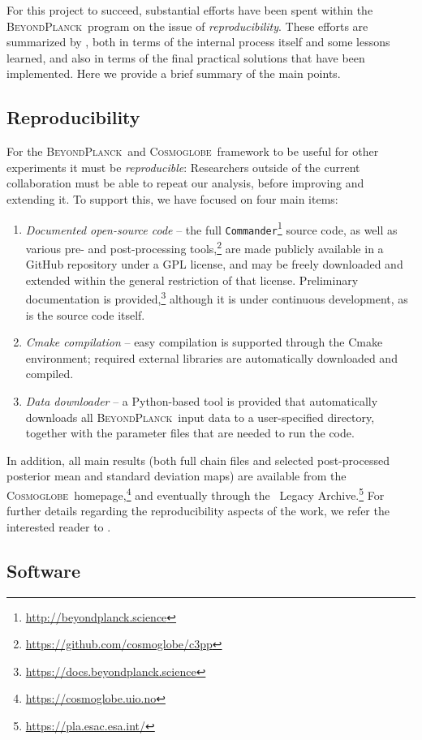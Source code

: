 \documentclass[onecolumn]{aa}
\def\commander{\texttt{Commander}}
\newcommand{\BP}{\textsc{BeyondPlanck}}
\newcommand{\cosmoglobe}{\textsc{Cosmoglobe}}
\begin{document}
For this project to succeed, substantial efforts have been spent
within the \BP\ program on the issue of \emph{reproducibility}. These
efforts are summarized by \citet{bp05}, both in terms of the internal
process itself and some lessons learned, and also in terms of the
final practical solutions that have been implemented. Here we provide
a brief summary of the main points.

\subsection{Reproducibility}

For the \BP\ and \cosmoglobe\ framework to be useful for other
experiments it must be \emph{reproducible}: Researchers outside of the
current collaboration must be able to repeat our analysis, before
improving and extending it. To support this, we have focused on four
main items:
\begin{enumerate}
\item \emph{Documented open-source code} -- the full
  \commander\footnote{\url{http://beyondplanck.science}} source code,
  as well as various pre- and post-processing
  tools,\footnote{\url{https://github.com/cosmoglobe/c3pp}} are made
  publicly available in a GitHub repository under a GPL license, and
  may be freely downloaded and extended within the general restriction
  of that license. Preliminary documentation is
  provided,\footnote{\url{https://docs.beyondplanck.science}} although
  it is under continuous development, as is the source code itself.
\item \emph{Cmake compilation} -- easy compilation is supported
  through the Cmake environment; required external libraries are
  automatically downloaded and compiled.
\item \emph{Data downloader} -- a Python-based tool is provided that
  automatically downloads all \BP\ input data to a user-specified
  directory, together with the parameter files that are needed to run
  the code.
\end{enumerate}
In addition, all main results (both full chain files and selected
post-processed posterior mean and standard deviation maps) are
available from the
\cosmoglobe\ homepage,\footnote{\url{https://cosmoglobe.uio.no}} and
eventually through the \Planck\ Legacy
Archive.\footnote{\url{https://pla.esac.esa.int/}} For further details
regarding the reproducibility aspects of the work, we refer the
interested reader to \citet{bp05}.

\subsection{Software}
\end{document}
